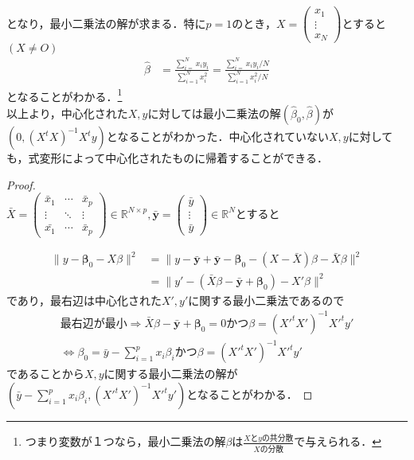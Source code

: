 \documentclass{jsarticle}
\theoremstyle{definition}
\begin{document}
となり，最小二乗法の解が求まる．特に$p=1$のとき，$X=\begin{pmatrix}
x_1\\
\vdots\\
x_N
\end{pmatrix}$とすると$(X\neq O)$
\begin{align*}
\hat{\beta}&=\frac{\sum_{i=}^N x_iy_i}{\sum_{i=1}^N x_i^2}=\frac{\sum_{i=}^N x_iy_i/N}{\sum_{i=1}^N x_i^2/N}
\end{align*}
となることがわかる．\footnote{つまり変数が１つなら，最小二乗法の解$\beta$は$\frac{Xとyの共分散}{Xの分散}$で与えられる．}\\

以上より，中心化された$X,y$に対しては最小二乗法の解$(\hat{\beta}_0,\hat{\beta})$が$(0,(X^tX)^{-1}X^t y)$となることがわかった．中心化されていない$X,y$に対しても，式変形によって中心化されたものに帰着することができる．
\begin{proof}\mbox{}\\
$\bar{X}=\begin{pmatrix}
\bar{x}_1 & \cdots & \bar{x}_p\\
\vdots & \ddots & \vdots\\
\bar{x_1} & \cdots & \bar{x}_p
\end{pmatrix}\in\mathbb{R}^{N\times p},\bar{{\bm y}}=\begin{pmatrix}
\bar{y}\\
\vdots\\
\bar{y}
\end{pmatrix}\in \mathbb{R}^N$とすると

\begin{align*}
\|y-{\bm \beta_0}-X\beta\|^2&=\|y-\bar{{\bm y}}+\bar{{\bm y}}-{\bm \beta}_0 -(X-\bar{X})\beta-\bar{X}\beta\|^2\\
&=\|y'-(\bar{X}\beta-\bar{{\bm y}}+{\bm \beta}_0)-X'\beta\|^2
\end{align*}
であり，最右辺は中心化された$X',y'$に関する最小二乗法であるので
\begin{align*}
最右辺が最小\Rightarrow \bar{X}\beta-\bar{{\bm y}}+{\bm \beta}_0=0かつ \beta=({X'}^tX')^{-1}{X'}^t y'\\
\Leftrightarrow  \beta_0=\bar{y}-\sum_{i=1}^p x_i\beta_iかつ\beta=({X'}^tX')^{-1}{X'}^ty'
\end{align*}
であることから$X,y$に関する最小二乗法の解が$(\bar{y}-\sum_{i=1}^p x_i\beta_i,({X'}^tX')^{-1}{X'}^t y')$となることがわかる．
\end{proof}
\end{document}
